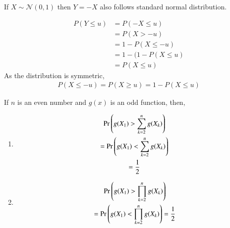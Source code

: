 \begin{lemma}
    If $X \sim \mathcal{N}(0,1)$ then $Y =-X$ also follows standard normal distribution.
\end{lemma}
\proof
\begin{align}
    P(Y \leq u) &= P(-X \leq u) \\
    &= P(X > -u) \\
    &= 1 - P(X \leq -u) \\
    &= 1 - (1 - P(X \leq u) \\
    &= P(X \leq u) 
\end{align}
As the distribution is symmetric, 
\begin{align}
 P(X\leq -u)=P(X\geq u)= 1-P(X\leq u)   
\end{align} 
\begin{lemma}
    If $n$ is an even number and $g(x)$ is an odd function, then,
    \begin{enumerate}
        \item 
    \begin{multline}\label{indep/3/equality}
        \Pr\left(g(X_1)>\sum_{k=2}^ng(X_k)\right) \\=
        \Pr\left(g(X_1)<\sum_{k=2}^ng(X_k)\right) \\
        = \frac{1}{2}
    \end{multline}
    \item 
    \begin{multline}
        \Pr\left(g(X_1)>\prod_{k=2}^ng(X_k)\right)\\=
        \Pr\left(g(X_1)<\prod_{k=2}^ng(X_k)\right) = \frac{1}{2}
    \end{multline}
    
\end{enumerate}
\end{lemma}
\proof 
